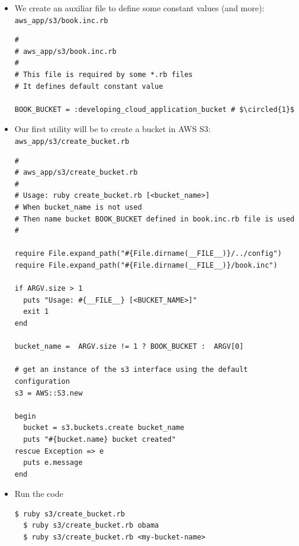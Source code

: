 \documentclass{beamer}
\newcommand*\circled[1]{\tikz[baseline=(char.base)]{
            \node[shape=circle,draw,inner sep=2pt] (char) {#1};}}
\begin{document}
\begin{frame}
\begin{itemize}
\begin{lstlisting}[escapechar=$]
require 'rubygems'
require 'yaml'
require 'aws-sdk'

config_file = File.join(File.dirname(__FILE__),
                        "config.yml")
unless File.exist?(config_file)
  puts <<END
To run the samples, put your credentials in config.yml as follows:

access_key_id: YOUR_ACCESS_KEY_ID
secret_access_key: YOUR_SECRET_ACCESS_KEY

END
  exit 1
end

config = YAML.load(File.read(config_file))

unless config.kind_of?(Hash)
  puts <<END
config.yml is formatted incorrectly.  Please use the following format:

access_key_id: YOUR_ACCESS_KEY_ID
secret_access_key: YOUR_SECRET_ACCESS_KEY

END
  exit 1
end

AWS.config(config)
\end{lstlisting}

\item We create an auxiliar file to define some constant values (and more): \texttt{aws\_app/s3/book.inc.rb}
\lstset{language=Ruby, style=eclipse}
\begin{lstlisting}[escapechar=$]
#
# aws_app/s3/book.inc.rb
#
# This file is required by some *.rb files
# It defines default constant value

BOOK_BUCKET = :developing_cloud_application_bucket # $\circled{1}$
\end{lstlisting}

\item Our first utility will be to create a bucket in AWS S3: \texttt{aws\_app/s3/create\_bucket.rb}
\lstset{language=Ruby, style=eclipse}
\begin{lstlisting}[escapechar=$]
#
# aws_app/s3/create_bucket.rb
#
# Usage: ruby create_bucket.rb [<bucket_name>]
# When bucket_name is not used
# Then name bucket BOOK_BUCKET defined in book.inc.rb file is used
#

require File.expand_path("#{File.dirname(__FILE__)}/../config")
require File.expand_path("#{File.dirname(__FILE__)}/book.inc")

if ARGV.size > 1
  puts "Usage: #{__FILE__} [<BUCKET_NAME>]"
  exit 1
end

bucket_name =  ARGV.size != 1 ? BOOK_BUCKET :  ARGV[0]

# get an instance of the s3 interface using the default configuration
s3 = AWS::S3.new

begin
  bucket = s3.buckets.create bucket_name
  puts "#{bucket.name} bucket created"
rescue Exception => e
  puts e.message
end
\end{lstlisting}

\item Run the code
\lstset{language=shell}
\begin{lstlisting}[escapechar=!]
  $ ruby s3/create_bucket.rb
  $ ruby s3/create_bucket.rb obama
  $ ruby s3/create_bucket.rb <my-bucket-name>
\end{lstlisting}

\end{itemize}
\end{frame}
\end{document}
